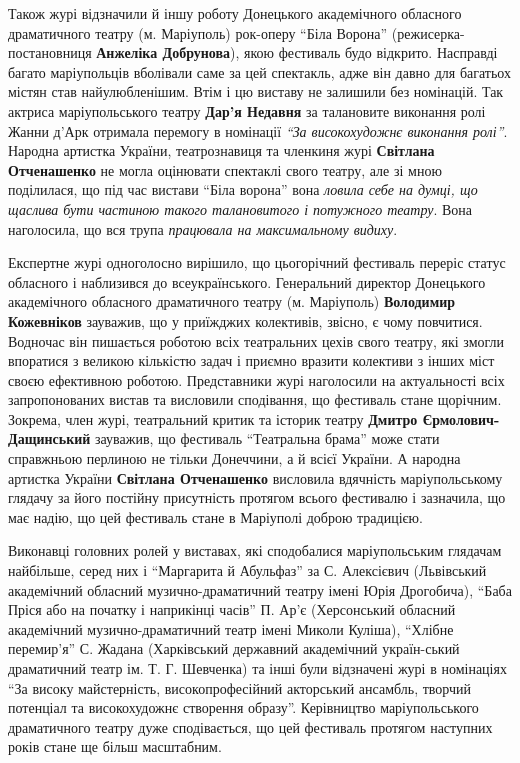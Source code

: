 
Також журі відзначили й іншу роботу Донецького академічного обласного
драматичного театру (м. Маріуполь) рок-оперу \enquote{Біла Ворона}
(режисерка-постановниця \textbf{Анжеліка Добрунова}), якою фестиваль будо відкрито.
Насправді багато маріупольців вболівали саме за цей спектакль, адже він давно
для багатьох містян став найулюбленішим. Втім і цю виставу не залишили без
номінацій. Так актриса маріупольського театру \textbf{Дар'я Недавня} за талановите
виконання ролі Жанни д'Арк отримала перемогу в номінації \emph{\enquote{За високохудожнє
виконання ролі}}. Народна артистка України, театрознавиця та членкиня журі
\textbf{Світлана Отченашенко} не могла оцінювати спектаклі свого театру, але зі мною
поділилася, що під час вистави  \enquote{Біла ворона} вона \emph{ловила себе на думці, що
щаслива бути частиною такого талановитого і потужного театру}. Вона наголосила,
що вся трупа \emph{працювала на максимальному видиху}.


Експертне журі одноголосно вирішило, що цьогорічний фестиваль переріс статус
обласного і наблизився до всеукраїнського. Генеральний директор Донецького
академічного обласного драматичного театру (м. Маріуполь) \textbf{Володимир Кожевніков}
зауважив, що у приїжджих колективів, звісно, є чому повчитися. Водночас він
пишається роботою всіх театральних цехів свого театру, які змогли впоратися з
великою кількістю задач і приємно вразити колективи з інших міст своєю
ефективною роботою.  Представники журі наголосили на актуальності всіх
запропонованих вистав та висловили сподівання, що фестиваль стане щорічним.
Зокрема, член журі, театральний критик та історик театру \textbf{Дмитро
Єрмолович-Дащинський} зауважив, що фестиваль \enquote{Театральна брама} може стати
справжньою перлиною не тільки Донеччини, а й всієї України. А народна артистка
України \textbf{Світлана Отченашенко} висловила вдячність маріупольському глядачу за
його постійну присутність протягом всього фестивалю і зазначила, що має надію,
що цей фестиваль стане  в Маріуполі доброю традицією.


Виконавці головних ролей у виставах, які сподобалися маріупольським глядачам
найбільше, серед них і \enquote{Маргарита й Абульфаз} за С. Алексієвич (Львівський
академічний обласний музично-драматичний театру імені Юрія Дрогобича), \enquote{Баба
Пріся або на початку і наприкінці часів} П. Ар'є (Херсонський обласний
академічний музично-драматичний театр імені Миколи Куліша), \enquote{Хлібне перемир'я}
С. Жадана (Харківський державний академічний україн\hyp{}ський драматичний театр ім.
Т. Г. Шевченка) та інші були відзначені журі в номінаціях \enquote{За високу
майстерність, високопрофесійний акторський ансамбль, творчий потенціал та
високохудожнє створення образу}. Керівництво маріупольського драматичного
театру дуже сподівається, що цей фестиваль протягом наступних років стане ще
більш масштабним.


